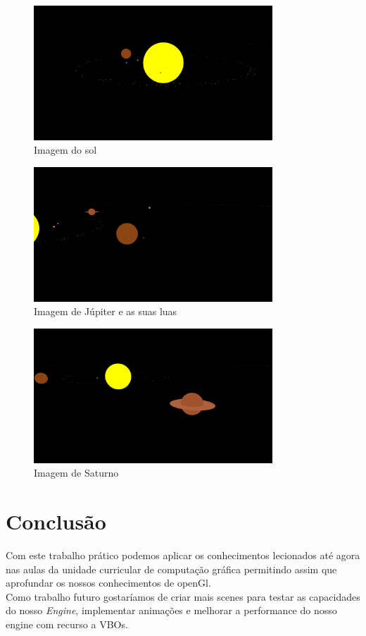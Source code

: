\documentclass[a4paper]{report}
\begin{document}
\begin{figure}[H]
    \centering 
    \includegraphics[width=0.8\textwidth]{images/sun.png}  
    \caption{Imagem do sol}
    \label{fig:sun}
\end{figure}
\begin{figure}[H]
    \centering 
    \includegraphics[width=0.8\textwidth]{images/jupiter.png}  
    \caption{Imagem de Júpiter e as suas luas}
    \label{fig:jupiter}
\end{figure}
\begin{figure}[H]
    \centering 
    \includegraphics[width=0.8\textwidth]{images/saturno.png}  
    \caption{Imagem de Saturno}
    \label{fig:saturn}
\end{figure}

\chapter{Conclusão}
Com este trabalho prático podemos aplicar os conhecimentos lecionados até agora
nas aulas da unidade curricular de computação gráfica permitindo assim que
aprofundar os nossos conhecimentos de openGl.\\
Como trabalho futuro gostaríamos de criar mais scenes para testar as capacidades
do nosso \textit{Engine}, implementar animações e melhorar a performance do
nosso engine com recurso a VBOs.
\end{document}
